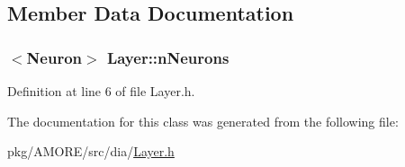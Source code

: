 \subsection{Member Data Documentation}
\hypertarget{class_layer_ac573cbb1730f10aee938edb0a8a1c382}{
\subsubsection[{nNeurons}]{$<${\bf Neuron}$>$ {\bf Layer::nNeurons}}}
\label{class_layer_ac573cbb1730f10aee938edb0a8a1c382}


Definition at line 6 of file Layer.h.



The documentation for this class was generated from the following file:\begin{DoxyCompactItemize}
\item 
pkg/AMORE/src/dia/\hyperlink{_layer_8h}{Layer.h}\end{DoxyCompactItemize}
